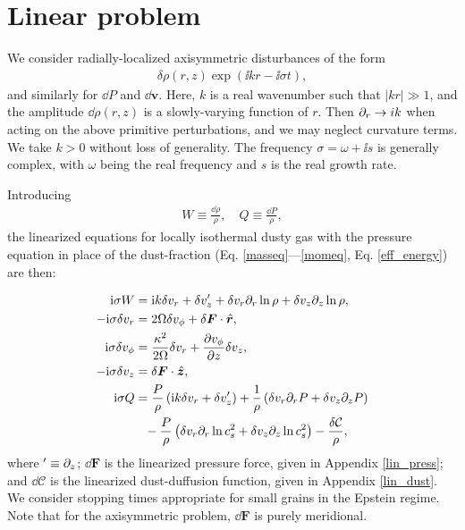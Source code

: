 \section{Linear problem} 
We consider radially-localized axisymmetric disturbances of the form 
\begin{align}
  \delta\rho(r, z)\exp{\left(\ii k r-\ii\sigma t\right)},
\end{align} 
and similarly for $\dd P$ and $\dd\bm{v}$. Here, $k$ is a real
wavenumber such that $|kr|\gg 1$, and the amplitude $\dd\rho(r,z)$ is
a slowly-varying function of $r$. Then 
$\partial_r\to i k$ when acting on the above primitive perturbations, and we may
neglect curvature terms. 
We take  
$k>0$ without loss of  generality. The frequency $\sigma = \omega +
\ii s$ is generally complex, with $\omega$ being the real frequency
and $s$ is the real growth rate. 

Introducing 
\begin{align}
  W \equiv \frac{\dd\rho}{\rho}, \quad Q \equiv \frac{\dd P}{\rho},
\end{align}
the linearized equations for
locally isothermal dusty gas with the pressure equation in place of
the dust-fraction (Eq. \ref{masseq}---\ref{momeq}, Eq. \ref{eff_energy}) are then:   

\begin{align}
  \mathrm{i}\sigma W &= \mathrm{i} k \delta v_r + \delta v_z^\prime +
  \delta v_r \partial_r\ln{\rho} + \delta v_z\partial_z\ln{\rho},\label{lin_mass}\\
  -\mathrm{i}\sigma\delta v_r  &= 2\Omega\delta v_\phi + 
  \delta\bm{F}\cdot\hat{\bm{r}},\label{lin_xmom}\\
  \mathrm{i}\sigma\delta v_\phi &= \frac{\kappa^2}{2\Omega}\delta v_r + \frac{\partial
    v_\phi}{\partial z}\delta v_z, \label{lin_ymom}\\
  -\mathrm{i}\sigma\delta v_z &=  \delta\bm{F}\cdot\hat{\bm{z}},\label{lin_zmom}\\
  \mathrm{i}\sigma Q &= \frac{P}{\rho}\left(\mathrm{i} k \delta v_r + \delta
               v_z^\prime\right) + \frac{1}{\rho}\left(\delta v_r\partial_rP + \delta v_z \partial_zP\right)\notag\\
                &\phantom{=}-\frac{P}{\rho}\left( \delta v_r\partial_r
               \ln{c_s^2} + \delta v_z \partial_z\ln{c_s^2}\right)-
               \frac{\delta\mathcal{C}}{\rho},\label{lin_energy} 
\end{align}  
where $^\prime \equiv \partial_z$; $\dd\bm{F}$ is the linearized pressure force, given in Appendix
\ref{lin_press}; and 
$\dd\mathcal{C}$ is the linearized dust-duffusion function, given in
Appendix \ref{lin_dust}. We consider stopping times appropriate for
small grains in the Epstein regime. Note that for the axisymmetric
problem, $\dd\bm{F}$ is purely meridional. 


